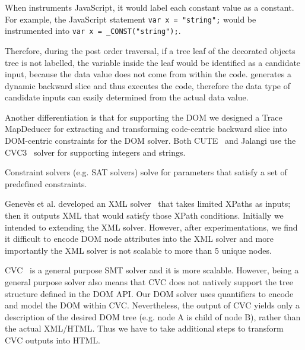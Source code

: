 When \tool instruments JavaScript, it would label each constant value as a constant.
For example, the JavaScript statement {\tt var x = "string";} would be instrumented into {\tt var x = \_CONST("string");}.  
  
Therefore, during the post order traversal, if a tree leaf of the decorated objects tree is not labelled, the variable inside the leaf would be identified as a candidate input, 
because the data value does not come from within the code.  
\tool generates a dynamic backward slice and thus executes the code, therefore the data type of candidate inputs can easily determined from the actual data value.  

Another differentiation is that for supporting the DOM we designed a Trace MapDeducer for extracting and transforming code-centric backward slice into DOM-centric constraints for the DOM solver.  
Both CUTE~\cite{cute} and Jalangi use the CVC3~\cite{cvc3} solver for supporting integers and strings.  





Constraint solvers (e.g. SAT solvers) solve for parameters that satisfy a set of predefined constraints.  

Genev\`{e}s et al. developed an XML solver~\cite{xmlsolver} that takes limited XPaths as inputs; then it outputs XML that would satisfy those XPath conditions. 
Initially we intended to extending the XML solver.  However, after experimentations, we find it difficult to encode DOM node attributes into the XML solver and 
more importantly the XML solver is not scalable to more than 5 unique nodes. 

CVC~\cite{cvc3, cvc4} is a general purpose SMT solver and it is more scalable.  
However, being a general purpose solver also means that CVC does not natively support the tree structure defined in the DOM API.  
Our DOM solver uses quantifiers to encode and model the DOM within CVC.  
Nevertheless, the output of CVC yields only a description of the desired DOM tree (e.g. node A is child of node B), rather than the actual XML/HTML. 
Thus we have to take additional steps to transform CVC outputs into HTML.


